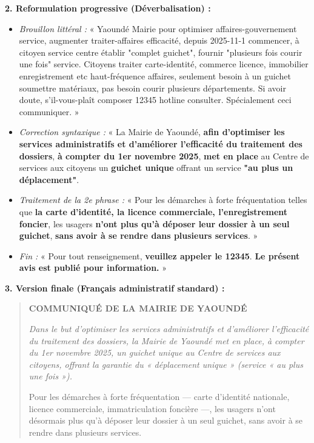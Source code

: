 \documentclass[11pt]{article}
\begin{document}
\begin{exoresolu}
\textbf{2. Reformulation progressive (Déverbalisation) :}
\begin{itemize}
    \item \textit{Brouillon littéral :} « Yaoundé Mairie pour optimiser affaires-gouvernement service, augmenter traiter-affaires efficacité, depuis 2025-11-1 commencer, à citoyen service centre établir "complet guichet", fournir "plusieurs fois courir une fois" service. Citoyens traiter carte-identité, commerce licence, immobilier enregistrement etc haut-fréquence affaires, seulement besoin à un guichet soumettre matériaux, pas besoin courir plusieurs départements. Si avoir doute, s'il-vous-plaît composer 12345 hotline consulter. Spécialement ceci communiquer. »
    \item \textit{Correction syntaxique :} « La Mairie de Yaoundé, \textbf{afin d'optimiser les services administratifs et d'améliorer l'efficacité du traitement des dossiers}, \textbf{à compter du 1er novembre 2025}, \textbf{met en place} au Centre de services aux citoyens un \textbf{guichet unique} offrant un service \textbf{"au plus un déplacement"}.
    \item \textit{Traitement de la 2e phrase :} « Pour les démarches à forte fréquentation telles que \textbf{la carte d'identité, la licence commerciale, l'enregistrement foncier}, les usagers \textbf{n'ont plus qu'à déposer leur dossier à un seul guichet}, \textbf{sans avoir à se rendre dans plusieurs services}. »
    \item \textit{Fin :} « Pour tout renseignement, \textbf{veuillez appeler le 12345}. \textbf{Le présent avis est publié pour information.} »
\end{itemize}

\textbf{3. Version finale (Français administratif standard) :}
\begin{quote}
\textbf{COMMUNIQUÉ DE LA MAIRIE DE YAOUNDÉ}

\textit{Dans le but d'optimiser les services administratifs et d'améliorer l'efficacité du traitement des dossiers, la Mairie de Yaoundé met en place, à compter du 1er novembre 2025, un guichet unique au Centre de services aux citoyens, offrant la garantie du « déplacement unique » (service « au plus une fois »).}

Pour les démarches à forte fréquentation — carte d'identité nationale, licence commerciale, immatriculation foncière —, les usagers n'ont désormais plus qu'à déposer leur dossier à un seul guichet, sans avoir à se rendre dans plusieurs services.


\end{quote}
\end{exoresolu}
\end{document}

